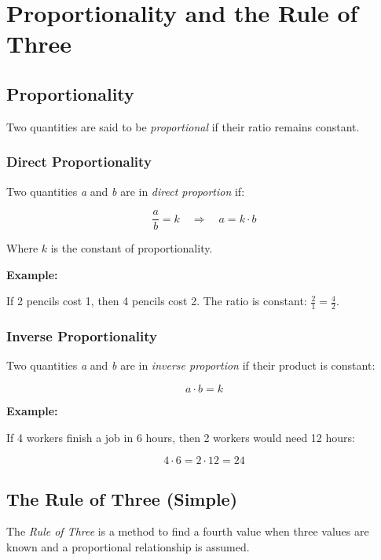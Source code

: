 \newpage
\section{Proportionality and the Rule of Three}

\subsection{Proportionality}

Two quantities are said to be \emph{proportional} if their ratio remains constant.

\subsubsection{Direct Proportionality}

Two quantities \emph{a} and \emph{b} are in \emph{direct proportion} if:

\[
    \frac{a}{b} = k \quad \Rightarrow \quad a = k \cdot b
\]

Where \(k\) is the constant of proportionality.
\vspace{\baselineskip}

\textbf{Example:}
\vspace{\baselineskip}
 
If 2 pencils cost 1, then 4 pencils cost 2. The ratio is constant: \(\frac{2}{1} = \frac{4}{2}\).

\subsubsection{Inverse Proportionality}

Two quantities \emph{a} and \emph{b} are in \emph{inverse proportion} if their product is constant:

\[
    a \cdot b = k
\]

\textbf{Example:}
\vspace{\baselineskip}

If 4 workers finish a job in 6 hours, then 2 workers would need 12 hours:

\[
    4 \cdot 6 = 2 \cdot 12 = 24
\]

\subsection{The Rule of Three (Simple)}

The \emph{Rule of Three} is a method to find a fourth value when three values are known and a 
proportional relationship is assumed.

